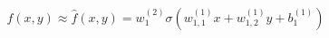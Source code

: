 \documentclass[preview]{standalone}
\begin{document}
\begin{align*}
f(x,y) \approx \hat{f}(x,y) =  w_1^{(2)} \sigma(w_{1,1}^{(1)}x + w_{1,2}^{(1)}y +b_1^{(1)})
\end{align*}
\end{document}
